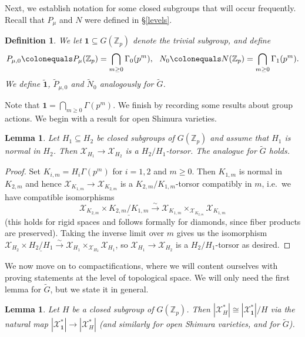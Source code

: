 \documentclass{amsart}
\newtheorem{lemma}[subsubsection]{Lemma}
\newtheorem{defn}[subsubsection]{Definition}
\theoremstyle{remark}
\numberwithin{equation}{subsection}
\newcommand{\Z}{\ZZ}
\newcommand{\ZZ}{{\mathbb Z}}
\newcommand{\cX}{{\mathcal X}}
\newcommand{\Zp}{\Z_p}
\newcommand{\toisom}{\xrightarrow{\sim}}
\newcommand{\mbf}{\mathbf}
\newcommand{\tG}{\widetilde{G}}
\newcommand{\tN}{\widetilde{N}}
\newcommand{\tP}{\widetilde{P}}
\newcommand{\ul}{\underline}
\newcommand{\wt}{\widetilde}
\newcommand{\sub}{\subseteq}
\newcommand{\defeq}{\colonequals}
\renewcommand{\(}{\left(}
\renewcommand{\)}{\right)}
\begin{document}
\medskip

Next, we establish notation for some closed subgroups that will occur frequently. Recall that $P_\mu$ and $N$ were defined in \S \ref{levels}.

\begin{defn}\label{frequent infinite level subgroups}
We let $\mbf{1} \sub G(\Zp)$ denote the trivial subgroup, and define
\[
 P_{\mu,0} \defeq P_\mu(\Zp) = \bigcap_{m\geq 0}\Gamma_{0}(p^{m}),\,\,\,\, N_{0} \defeq N(\Zp) = \bigcap_{m\geq 0}\Gamma_{1}(p^{m}).
\]
We define $\wt{\mbf{1}}$, $\tP_{\mu,0}$ and $\tN_0$ analogously for $\tG$.
\end{defn}

Note that $\mbf{1}=\bigcap_{m\geq 0}\Gamma(p^{m})$. We finish by recording some results about group actions. We begin with a result for open Shimura varieties.

\begin{lemma}\label{torsor}
Let $H_1 \sub H_2$ be closed subgroups of $G(\Zp)$ and assume that $H_1$ is normal in $H_2$. Then $\cX_{H_{1}} \to \cX_{H_{2}}$ is a $H_{2}/H_{1}$-torsor. The analogue for $\tG$ holds.
\end{lemma}

\begin{proof}
Set $K_{i,m}=H_{i}\Gamma(p^m)$ for $i=1,2$ and $m\geq 0$. Then $K_{1,m}$ is normal in $K_{2,m}$ and hence $\cX_{K_{1,m}} \to \cX_{K_{2,m}}$ is a $K_{2,m}/K_{1,m}$-torsor compatibly in $m$, i.e.\ we have compatible isomorphisms
\[
 \cX_{K_{2,m}} \times \ul{K_{2,m}/K_{1,m}} \toisom \cX_{K_{1,m}} \times_{\cX_{K_{2,m}}} \cX_{K_{1,m}}
 \]
(this holds for rigid spaces and follows formally for diamonds, since fiber products are preserved). Taking the inverse limit over $m$ gives us the isomorphism $\cX_{H_{2}} \times \ul{H_{2}/H_{1}} \toisom \cX_{H_{1}} \times_{\cX_{H_{2}}} \cX_{H_{1}}$, so $\cX_{H_{1}} \to \cX_{H_{2}}$ is a $H_{2}/H_{1}$-torsor as desired. 
\end{proof}

We now move on to compactifications, where we will content ourselves with proving statements at the level of topological space. We will only need the first lemma for $\tG$, but we state it in general.

\begin{lemma}\label{exhibiting a diamond as a quotient}
Let $H$ be a closed subgroup of $G(\Zp)$. Then $|\cX^{\ast}_H|\cong |\cX^{\ast}_{\mbf{1}}|/H$ via the natural map $|\cX^{\ast}_{\mbf{1}}| \to |\cX^{\ast}_H|$ (and similarly for open Shimura varieties, and for $\tG$).
\end{lemma}
\end{document}
